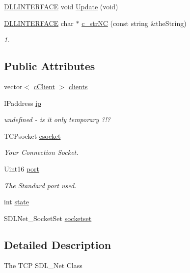 \begin{DoxyCompactItemize}
\item 
\hyperlink{_s_d_l__ep_8h_a38dd54df4631b4daf553096353d7b20b}{D\-L\-L\-I\-N\-T\-E\-R\-F\-A\-C\-E} void \hyperlink{classc_t_c_p_net_acca79819b5441b3515cd8443de0b15f8}{Update} (void)
\item 
\hyperlink{_s_d_l__ep_8h_a38dd54df4631b4daf553096353d7b20b}{D\-L\-L\-I\-N\-T\-E\-R\-F\-A\-C\-E} char $\ast$ \hyperlink{classc_t_c_p_net_aae423bb92891dc62a6ebd443cbfa9755}{c\-\_\-str\-N\-C} (const string \&the\-String)
\begin{DoxyCompactList}\small\item\em 1. \end{DoxyCompactList}\end{DoxyCompactItemize}
\subsection*{Public Attributes}
\begin{DoxyCompactItemize}
\item 
vector$<$ \hyperlink{classc_client}{c\-Client} $>$ \hyperlink{classc_t_c_p_net_ac0889feea9550dc2ef0461be16b408f0}{clients}
\item 
I\-Paddress \hyperlink{classc_t_c_p_net_a103f0ae57ea6253901756aa7ba2c1275}{ip}
\begin{DoxyCompactList}\small\item\em undefined -\/ is it only temporary ?!? \end{DoxyCompactList}\item 
T\-C\-Psocket \hyperlink{classc_t_c_p_net_a67aece277603c2e1a53eb09d74618a9b}{csocket}
\begin{DoxyCompactList}\small\item\em Your Connection Socket. \end{DoxyCompactList}\item 
Uint16 \hyperlink{classc_t_c_p_net_aad0ef85255e170e890b7591169da57b0}{port}
\begin{DoxyCompactList}\small\item\em The Standard port used. \end{DoxyCompactList}\item 
int \hyperlink{classc_t_c_p_net_a07e6aa8d2af28f80aeefcce1b7c416c3}{state}
\item 
S\-D\-L\-Net\-\_\-\-Socket\-Set \hyperlink{classc_t_c_p_net_aa4a4f4b31756814afe9358f006594a81}{socketset}
\end{DoxyCompactItemize}


\subsection{Detailed Description}
The T\-C\-P S\-D\-L\-\_\-\-Net Class 

